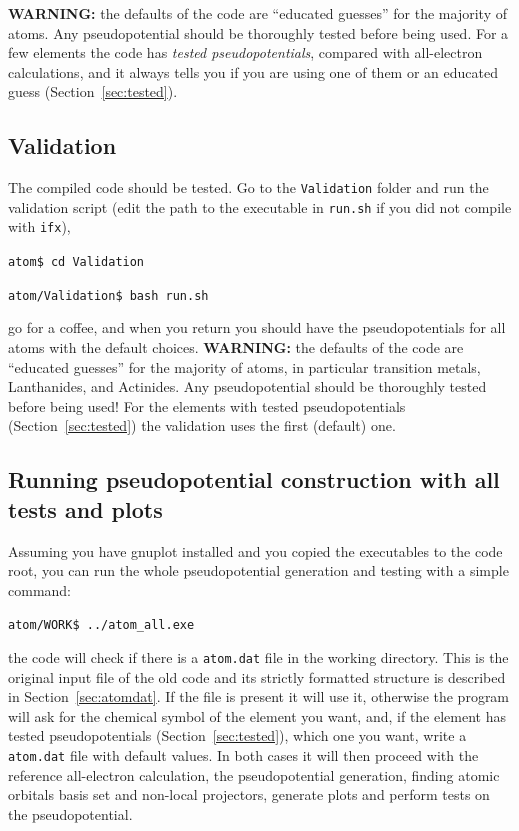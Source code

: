 \documentclass[11pt]{article}
\begin{document}
\textbf{WARNING:} the defaults of the code are ``educated guesses'' for the majority of atoms.
Any pseudopotential should be thoroughly tested before being used.
For a few elements the code has \textit{tested pseudopotentials}, compared with
all-electron calculations, and it always tells you if you are using one of them
or an educated guess (Section~\ref{sec:tested}).

\subsection{Validation}
\label{sec:valid}

The compiled code should be tested.  Go to the \texttt{Validation} folder and run the
validation script (edit the path to the executable in \texttt{run.sh} if you did not
compile with \texttt{ifx}),

\noindent\texttt{atom\$ cd Validation}

\noindent\texttt{atom/Validation\$ bash run.sh}

go for a coffee, and when you return you should have the pseudopotentials for all atoms
with the default choices.   \textbf{WARNING:} the defaults of the code are ``educated guesses''
for the majority of atoms, in particular transition metals, Lanthanides, and Actinides.
Any pseudopotential should be thoroughly tested before being used!
For the elements with tested pseudopotentials (Section~\ref{sec:tested}) the validation
uses the first (default) one.

\subsection{Running pseudopotential construction with all tests and plots}
\label{sec:run-all}

Assuming you have gnuplot installed and you copied the executables to the code root, you can run
the whole pseudopotential generation and testing with a simple command:

\noindent\texttt{atom/WORK\$ ../atom{\_}all.exe}

\noindent
the code will check if there is a \texttt{atom.dat} file in the working directory.
This is the original input file of the old code and its strictly formatted structure
is described in Section~\ref{sec:atomdat}.
If the file is present it will use it, otherwise
the program will ask for the chemical symbol of the element you want,
and, if the element has tested pseudopotentials (Section~\ref{sec:tested}), which one you want,
write a \texttt{atom.dat} file with default values.  In both cases it will then proceed with
the reference all-electron calculation, the pseudopotential generation,
finding atomic orbitals basis set and non-local projectors, generate plots and perform tests on the pseudopotential.
\end{document}
